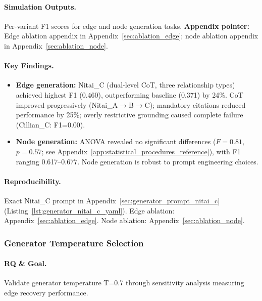 \paragraph{Simulation Outputs.}
Per-variant F1 scores for edge and node generation tasks.
\textbf{Appendix pointer:} Edge ablation appendix in Appendix~\ref{sec:ablation_edge}; node ablation appendix in Appendix~\ref{sec:ablation_node}.

\paragraph{Key Findings.}
\begin{itemize}[noitemsep]
    \item \textbf{Edge generation:} Nitai\_C (dual-level CoT, three relationship types) achieved highest F1 (0.460), outperforming baseline (0.371) by 24\%. CoT improved progressively (Nitai\_A$\rightarrow$B$\rightarrow$C); mandatory citations reduced performance by 25\%; overly restrictive grounding caused complete failure (Cillian\_C: F1=0.00).
    \item \textbf{Node generation:} ANOVA revealed no significant differences ($F=0.81$, $p=0.57$; see Appendix~\ref{app:statistical_procedures_reference}), with F1 ranging 0.617--0.677. Node generation is robust to prompt engineering choices.
\end{itemize}

\paragraph{Reproducibility.}
Exact Nitai\_C prompt in Appendix~\ref{sec:generator_prompt_nitai_c} (Listing~\ref{lst:generator_nitai_c_yaml}). Edge ablation: Appendix~\ref{sec:ablation_edge}. Node ablation: Appendix~\ref{sec:ablation_node}.

\subsubsection{Generator Temperature Selection}

\paragraph{RQ \& Goal.}
Validate generator temperature T=0.7 through sensitivity analysis measuring edge recovery performance.

